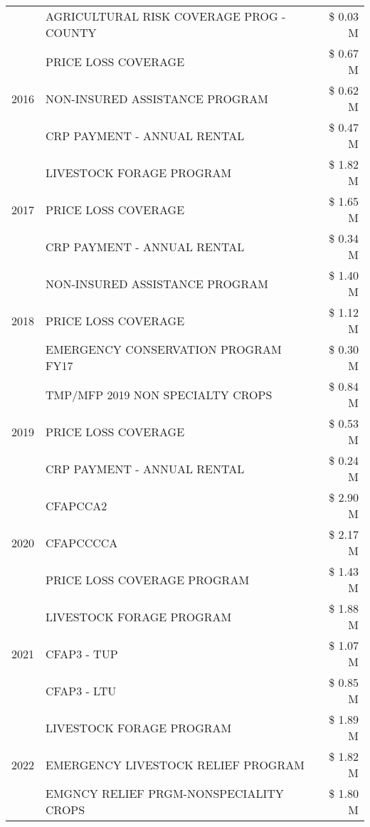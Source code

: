 \begin{tabular}{llr}
 & AGRICULTURAL RISK COVERAGE PROG - COUNTY & \$ 0.03 M \\
\cline{1-3}
\multirow[t]{3}{*}{2016} & PRICE LOSS COVERAGE & \$ 0.67 M \\
 & NON-INSURED ASSISTANCE PROGRAM & \$ 0.62 M \\
 & CRP PAYMENT - ANNUAL RENTAL & \$ 0.47 M \\
\cline{1-3}
\multirow[t]{3}{*}{2017} & LIVESTOCK FORAGE PROGRAM & \$ 1.82 M \\
 & PRICE LOSS COVERAGE & \$ 1.65 M \\
 & CRP PAYMENT - ANNUAL RENTAL & \$ 0.34 M \\
\cline{1-3}
\multirow[t]{3}{*}{2018} & NON-INSURED ASSISTANCE PROGRAM & \$ 1.40 M \\
 & PRICE LOSS COVERAGE & \$ 1.12 M \\
 & EMERGENCY CONSERVATION PROGRAM FY17 & \$ 0.30 M \\
\cline{1-3}
\multirow[t]{3}{*}{2019} & TMP/MFP 2019 NON SPECIALTY CROPS & \$ 0.84 M \\
 & PRICE LOSS COVERAGE & \$ 0.53 M \\
 & CRP PAYMENT - ANNUAL RENTAL & \$ 0.24 M \\
\cline{1-3}
\multirow[t]{3}{*}{2020} & CFAPCCA2 & \$ 2.90 M \\
 & CFAPCCCCA & \$ 2.17 M \\
 & PRICE LOSS COVERAGE PROGRAM & \$ 1.43 M \\
\cline{1-3}
\multirow[t]{3}{*}{2021} & LIVESTOCK FORAGE PROGRAM & \$ 1.88 M \\
 & CFAP3 - TUP & \$ 1.07 M \\
 & CFAP3 - LTU & \$ 0.85 M \\
\cline{1-3}
\multirow[t]{3}{*}{2022} & LIVESTOCK FORAGE PROGRAM & \$ 1.89 M \\
 & EMERGENCY LIVESTOCK RELIEF PROGRAM & \$ 1.82 M \\
 & EMGNCY RELIEF PRGM-NONSPECIALITY CROPS & \$ 1.80 M \\
\cline{1-3}
\bottomrule
\end{tabular}
